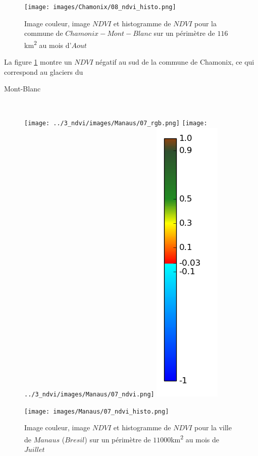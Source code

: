 \documentclass{book}
\begin{document}
\begin{figure}[H]
{}
\begin{center}
\texttt{[image: images/Chamonix/08\_ndvi\_histo.png]}
\end{center}
\caption{Image couleur, image $NDVI$ et histogramme de $NDVI$ pour la commune de $Chamonix-Mont-Blanc$ sur un périmètre de $116$km\textsuperscript{2} au mois d'$Aout$}
\label{chamonix_ndvi}
\end{figure}

La figure \ref{chamonix_ndvi} montre un $NDVI$ négatif au sud de la commune de Chamonix, ce qui correspond au glaciers du \begin{itshape}Mont-Blanc\end{itshape}\\

\clearpage 

\begin{figure}[H]
\centerline{
\texttt{[image: ../3\_ndvi/images/Manaus/07\_rgb.png]}
\texttt{[image: ../3\_ndvi/images/Manaus/07\_ndvi.png]}
\includegraphics[scale=0.4]{../3_ndvi/images/colormap.png}
}
\begin{center}
\texttt{[image: images/Manaus/07\_ndvi\_histo.png]}
\end{center}
\caption{Image couleur, image $NDVI$ et histogramme de $NDVI$ pour la ville de $Manaus$ ($Bresil$) sur un périmètre de $11000$km\textsuperscript{2} au mois de $Juillet$}
\label{manaus_ndvi}
\end{figure}
\end{document}
